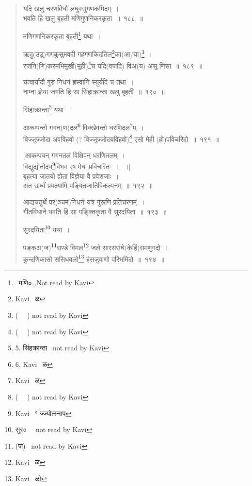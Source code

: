\documentclass[11pt, openany]{book}
\begin{document}
\newpage

\begin{quote}
{\na यदि खलु चरणविधौ लघुवसुगणकमिदम्~।\\
भवति हि खलु बृहती मणिगुणनिकरकृता~॥~१८८~॥}

मणिगणनिकरकृता बृहती\renewcommand{\thefootnote}{1}\footnote{ \textendash\ मणि०\ldots Not read by Kavi} यथा~।

{\na ऋदु(उडु)गणकुसुमवदी गहगणकिदतिल\renewcommand{\thefootnote}{2}\footnote{Kavi \textendash\ ळ}का(आ/या)\renewcommand{\thefootnote}{3}\footnote{( \textendash\ \textendash\ \textendash ) not read by Kavi}~।\\
रजनि(णि)करमभिमुखी(मुही)\renewcommand{\thefootnote}{4}\footnote{( \textendash\ \textendash\ \textendash ) not read by Kavi}च यदि(वजदि) विअ(य) असु णिसा~॥~१८९~॥}

{ }

{\na चत्वार्यादौ गुरु निधनं ह्रस्वानि स्युर्यदि च तथा~। \\
नाम्ना ज्ञेया जगति हि सा सिंहाक्रान्ता खलु बृहती~॥~१९०~॥}

सिंहाक्रान्ता\renewcommand{\thefootnote}{5}\footnote{5. सिंहक्रान्ता \textendash\ not read by Kavi} यथा~।

{\na आकम्पन्तो गगन(ण)दलं\renewcommand{\thefootnote}{6}\footnote{6. Kavi \textendash\ ळ} विक्खेवन्तो धरणिदल\renewcommand{\thefootnote}{7}\footnote{Kavi \textendash\ ळ}म्~।\\
विज्जुज्जोदा अवविहवो (? विज्जुज्जोदयविहवो)\renewcommand{\thefootnote}{8}\footnote{( \textendash\ \textendash\ \textendash ) not read by Kavi} एसो मेही (हो)पविचरिदो~॥~१९१~॥

[आकम्पयन् गगनतलं विक्षिपन् धरणितलम्~।\\
विद्युद्योतोदय\renewcommand{\thefootnote}{9}\footnote{Kavi \textendash\ ° ज्ज्योत्स्नाप}विभव एष मेघः प्रविचरितः~। ~।]\\
बृहत्या जातयो ह्येता विज्ञेया वै प्रवेशजाः~। \\
अत ऊर्ध्वं प्रवक्ष्यामि पङ्क्तिजातिविकल्पनम्~॥~१९२~॥

आद्यचतुर्थे पर(ञ्चम)निधने यत्र गुरूणि प्रतिचरणम्~।\\
गीतविधाने भवति हि सा पङ्क्तिकृता वै सुरदयिता~॥~१९३~॥}

सुरदयिता\renewcommand{\thefootnote}{10}\footnote{सुर० \textendash\ \textendash\ \textendash not read by Kavi} यथा~।

{\na पङ्कअ(ज)\renewcommand{\thefootnote}{11}\footnote{(ज) \textendash\ not read by Kavi}सण्डे विमल\renewcommand{\thefootnote}{12}\footnote{Kavi \textendash\ ळ} जले सारससंघे(केहिं)समणुगदो~। \\
कुन्दणिकासो ससिधवलो\renewcommand{\thefootnote}{13}\footnote{Kavi \textendash\ ळो} हंसजुवाणो परिभमिदो~॥~१९४~॥}


\end{quote}
\end{document}
